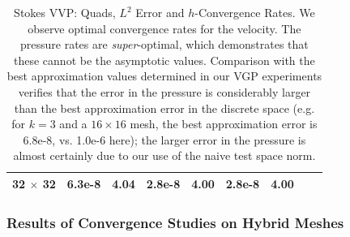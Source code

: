 \begin{table}[h!b!p!]
\begin{center}
\begin{tabular}{| c | c | c | c | c | c | c | c | c |}
32 $\times$ 32         	&6.3e-8	&4.04	&2.8e-8	&4.00	&2.8e-8      	&4.00	\\
\hline
\end{tabular}
\end{center} 
\caption{Stokes VVP: Quads, $L^{2}$ Error and $h$-Convergence Rates.  We observe optimal convergence rates for the velocity.  The pressure rates are \emph{super}-optimal, which demonstrates that these cannot be the asymptotic values.  Comparison with the best approximation values determined in our VGP experiments verifies that the error in the pressure is considerably larger than the best approximation error in the discrete space (e.g. for $k=3$ and a $16 \times 16$ mesh, the best approximation error is 6.8e-8, vs. 1.0e-6 here); the larger error in the pressure is almost certainly due to our use of the naive test space norm.}
\label{NVR:table:VVPQuadRates}
\end{table}




\clearpage
\subsubsection{Results of Convergence Studies on Hybrid Meshes}

\vspace{1.59in}

